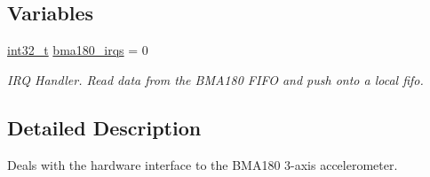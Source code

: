 \subsection*{Variables}
\begin{DoxyCompactItemize}
\item 
\hyperlink{group___n_a_m_e_gafd12020da5a235dfcf0c3c748fb5baed}{int32\-\_\-t} \hyperlink{group___p_i_o_s___b_m_a180_gabbaf3c8a871b2c19d493446ad684c3dc}{bma180\-\_\-irqs} = 0
\begin{DoxyCompactList}\small\item\em I\-R\-Q Handler. Read data from the B\-M\-A180 F\-I\-F\-O and push onto a local fifo. \end{DoxyCompactList}\end{DoxyCompactItemize}


\subsection{Detailed Description}
Deals with the hardware interface to the B\-M\-A180 3-\/axis accelerometer. 

